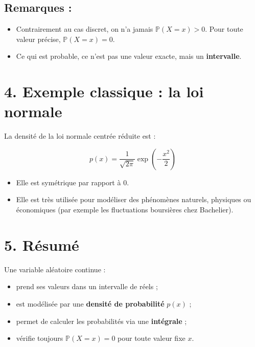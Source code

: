 \documentclass[11pt]{article}
\begin{document}
\subsection*{Remarques :}
\begin{itemize}
    \item Contrairement au cas discret, on n’a jamais \( \mathbb{P}(X = x) > 0 \). Pour toute valeur précise, \( \mathbb{P}(X = x) = 0 \).
    \item Ce qui est probable, ce n’est pas une valeur exacte, mais un \textbf{intervalle}.
\end{itemize}

\section*{4. Exemple classique : la loi normale}

La densité de la loi normale centrée réduite est :

\[
\boxed{
p(x) = \frac{1}{\sqrt{2\pi}} \exp\left(-\frac{x^2}{2}\right)
}
\]

\begin{itemize}
    \item Elle est symétrique par rapport à 0.
    \item Elle est très utilisée pour modéliser des phénomènes naturels, physiques ou économiques (par exemple les fluctuations boursières chez Bachelier).
\end{itemize}

\section*{5. Résumé}

\begin{tcolorbox}[colback=yellow!5!white, colframe=yellow!60!black, title=Résumé]
Une variable aléatoire continue :
\begin{itemize}
    \item prend ses valeurs dans un intervalle de réels ;
    \item est modélisée par une \textbf{densité de probabilité} \( p(x) \) ;
    \item permet de calculer les probabilités via une \textbf{intégrale} ;
    \item vérifie toujours \( \mathbb{P}(X = x) = 0 \) pour toute valeur fixe \( x \).
\end{itemize}
\end{tcolorbox}
\end{document}
